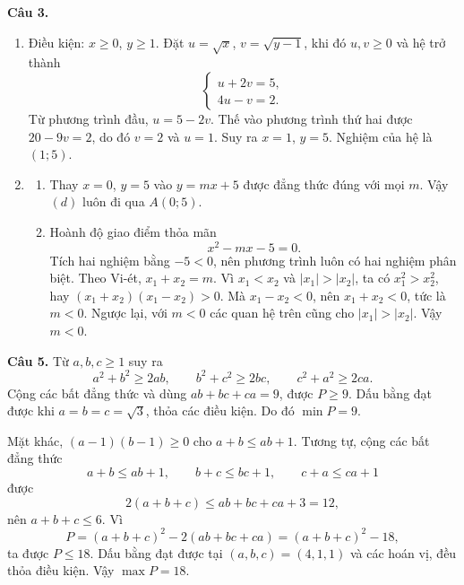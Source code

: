 \documentclass[12pt,a4paper]{article}
\begin{document}
\textbf{Câu 3.}
\begin{enumerate}[label=\alph*)]
  \item Điều kiện: $x\ge0$, $y\ge1$. Đặt $u=\sqrt{x}$, $v=\sqrt{y-1}$, khi đó $u,v\ge0$ và hệ trở thành
  \[
  \begin{cases}u+2v=5,\\4u-v=2.\end{cases}
  \]
  Từ phương trình đầu, $u=5-2v$. Thế vào phương trình thứ hai được $20-9v=2$, do đó $v=2$ và $u=1$. Suy ra $x=1$, $y=5$. Nghiệm của hệ là $(1;5)$.
  \item
  \begin{enumerate}[label=(\alph*)]
    \item Thay $x=0$, $y=5$ vào $y=mx+5$ được đẳng thức đúng với mọi $m$. Vậy $(d)$ luôn đi qua $A(0;5)$.
    \item Hoành độ giao điểm thỏa mãn
    \[
    x^2-mx-5=0.
    \]
    Tích hai nghiệm bằng $-5<0$, nên phương trình luôn có hai nghiệm phân biệt. Theo Vi-ét, $x_1+x_2=m$. Vì $x_1<x_2$ và $|x_1|>|x_2|$, ta có $x_1^2>x_2^2$, hay $(x_1+x_2)(x_1-x_2)>0$. Mà $x_1-x_2<0$, nên $x_1+x_2<0$, tức là $m<0$. Ngược lại, với $m<0$ các quan hệ trên cũng cho $|x_1|>|x_2|$. Vậy $m<0$.
  \end{enumerate}
\end{enumerate}

\textbf{Câu 5.} Từ $a,b,c\ge1$ suy ra
\[
a^2+b^2\ge2ab,\qquad b^2+c^2\ge2bc,\qquad c^2+a^2\ge2ca.
\]
Cộng các bất đẳng thức và dùng $ab+bc+ca=9$, được $P\ge9$. Dấu bằng đạt được khi $a=b=c=\sqrt{3}$, thỏa các điều kiện. Do đó $\min P=9$.

Mặt khác, $(a-1)(b-1)\ge0$ cho $a+b\le ab+1$. Tương tự, cộng các bất đẳng thức
\[
a+b\le ab+1,\qquad b+c\le bc+1,\qquad c+a\le ca+1
\]
được
\[
2(a+b+c)\le ab+bc+ca+3=12,
\]
nên $a+b+c\le6$. Vì
\[
P=(a+b+c)^2-2(ab+bc+ca)=(a+b+c)^2-18,
\]
ta được $P\le18$. Dấu bằng đạt được tại $(a,b,c)=(4,1,1)$ và các hoán vị, đều thỏa điều kiện. Vậy $\max P=18$.
\end{document}
